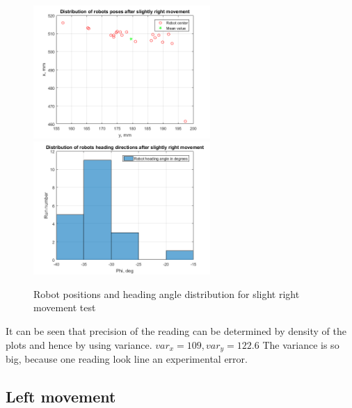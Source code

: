 \documentclass[a4paper, 12pt]{article}
\begin{document}
\begin{figure}[h]
  \centering
  \caption{Robot positions and heading angle distribution for slight right movement test\label{fig:r}}
  \includegraphics[width=0.6\textwidth]{r}
  \includegraphics[width=0.6\textwidth]{rphi}
\end{figure}

It can be seen that precision of the reading can be determined by density of the plots and hence by using variance. $var_x = 109,var_y = 122.6$ The variance is so big, because one reading look line an experimental error.
\newpage
\subsection{Left movement}
\end{document}
